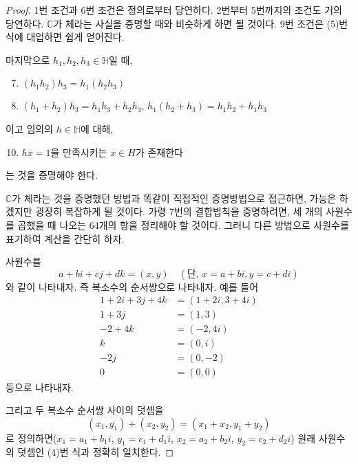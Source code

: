 \documentclass{article}
\newcounter{num}
\begin{document}
\begin{proof}
1번 조건과 6번 조건은 정의로부터 당연하다.
2번부터 5번까지의 조건도 거의 당연하다.
\(\mathbb C\)가 체라는 사실을 증명할 때와 비슷하게 하면 될 것이다.
9번 조건은 (5)번 식에 대입하면 쉽게 얻어진다.

마지막으로 \(h_1,h_2,h_3\in\mathbb H\)일 때,
\begin{enumerate}\setcounter{enumi}{6}
\item
\((h_1h_2)h_3=h_1(h_2h_3)\)
\item
\((h_1+h_2)h_3=h_1h_3+h_2h_3\), \(h_1(h_2+h_3)=h_1h_2+h_1h_3\)
\end{enumerate}
이고 임의의 \(h\in \mathbb H\)에 대해,
\begin{enumerate}\setcounter{enumi}{9}
\item
\(hx=1\)을 만족시키는 \(x\in H\)가 존재한다
\end{enumerate}
는 것을 증명해야 한다.

\(\mathbb C\)가 체라는 것을 증명했던 방법과 똑같이 직접적인 증명방법으로 접근하면, 가능은 하겠지만 굉장히 복잡하게 될 것이다.
가령 7번의 결합법칙을 증명하려면, 세 개의 사원수를 곱했을 때 나오는 64개의 항을 정리해야 할 것이다.
그러니 다른 방법으로 사원수를 표기하여 계산을 간단히 하자.

사원수를
\begin{equation}
a+bi+cj+dk=(x,y)\quad(\text{단, }x=a+bi,y=c+di)
\end{equation}
와 같이 나타내자.
즉 복소수의 순서쌍으로 나타내자.
예를 들어
\begin{align*}
1+2i+3j+4k	&=(1+2i, 3+4i)\\
1+3j		&=(1,3)\\
-2+4k		&=(-2,4i)\\
k		&=(0,i)\\
-2j		&=(0,-2)\\
0		&=(0,0)
\end{align*}
등으로 나타내자.

그리고 두 복소수 순서쌍 사이의 덧셈을
\begin{equation}
(x_1,y_1)+(x_2,y_2)=(x_1+x_2,y_1+y_2)
\end{equation}
로 정의하면(\(x_1=a_1+b_1i\), \(y_1=c_1+d_1i\), \(x_2=a_2+b_2i\), \(y_2=c_2+d_2i\))
원래 사원수의 덧셈인 (4)번 식과 정확히 일치한다.


\end{proof}
\end{document}
